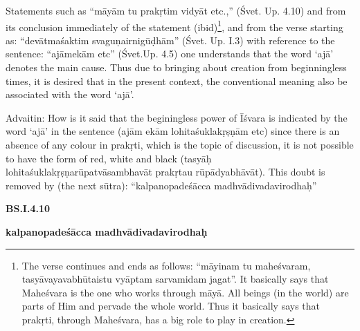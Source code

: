 Statements such as “māyām tu prakṛtim vidyāt etc.,” (Śvet. Up. 4.10) and from its conclusion immediately of the statement (ibid)\footnote{The verse continues and ends as  follows: “māyinam tu maheśvaram, tasyāvayavabhūtaistu vyāptam sarvamidam jagat”. It basically says that Maheśvara is the one who works through māyā. All beings (in the world) are parts of Him and pervade the whole world. Thus it basically says that prakṛti, through Maheśvara, has a big role to play in creation.}, and from the verse starting  as:  “devātmaśaktim svaguṇairnigūḍhām” (Śvet. Up. I.3) with reference to the sentence: “ajāmekām etc” (Śvet.Up. 4.5) one understands that the word ‘ajā’ denotes the main cause. Thus due to bringing about creation from beginningless times, it is desired that in the present context, the conventional meaning also be associated with the word ‘ajā’.

Advaitin: How is it said that the beginingless power of Īśvara is indicated by the word ‘ajā’ in the sentence (ajām  ekām lohitaśuklakṛṣṇām etc) since there is an absence of any colour in prakṛti, which is the topic of discussion, it is not possible to have the form of red, white and black (tasyāḥ lohitaśuklakṛṣṇarūpatvāsambhavāt prakṛtau rūpādyabhāvāt). This doubt is removed by (the next sūtra): “kalpanopadeśācca madhvādivadavirodhaḥ”

\textbf{}



\textbf{BS.I.4.10}

\textbf{kalpanopadeśācca madhvādivadavirodhaḥ}

